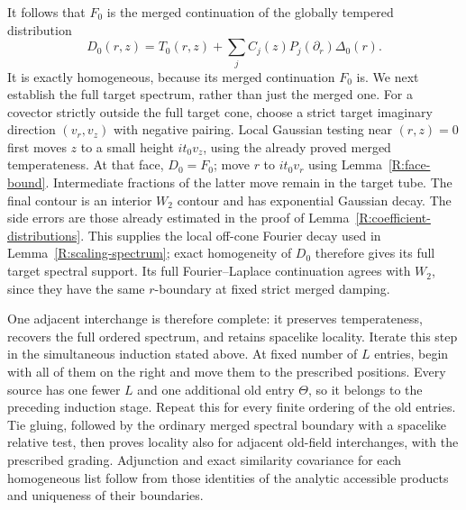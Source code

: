 It follows that $F_0$ is the merged continuation of the globally
tempered distribution
\begin{equation}\label{R:D0}
 D_0(r,z)=T_0(r,z)+\sum_j C_j(z)P_j(\partial_r)\Delta_0(r).
\end{equation}
It is exactly homogeneous, because its merged continuation $F_0$
is.  We next establish the full target spectrum, rather than just
the merged one.  For a covector strictly outside the full target
cone, choose a strict target imaginary direction $(v_r,v_z)$ with
negative pairing.  Local Gaussian testing near $(r,z)=0$ first
moves $z$ to a small height $it_0v_z$, using the already proved
merged temperateness.  At that face, $D_0=F_0$; move $r$ to
$it_0v_r$ using Lemma~\ref{R:face-bound}.  Intermediate fractions of
the latter move remain in the target tube.  The final contour is an
interior $W_2$ contour and has exponential Gaussian decay.  The side
errors are those already estimated in the proof of
Lemma~\ref{R:coefficient-distributions}.  This supplies the local
off-cone Fourier decay used in Lemma~\ref{R:scaling-spectrum}; exact
homogeneity of $D_0$ therefore gives its full target spectral support.
Its full Fourier--Laplace continuation agrees with $W_2$, since they
have the same $r$-boundary at fixed strict merged damping.

One adjacent interchange is therefore complete: it preserves
temperateness, recovers the full ordered spectrum, and retains
spacelike locality.  Iterate this step in the simultaneous
induction stated above.  At fixed number of $L$ entries, begin with
all of them on the right and move them to the prescribed positions.
Every source has one fewer $L$ and one additional old entry $\Theta$,
so it belongs to the preceding induction stage.  Repeat this for
every finite ordering of the old entries.  Tie gluing, followed by the
ordinary merged spectral boundary with a spacelike relative test,
then proves locality also for adjacent old-field interchanges, with
the prescribed grading.  Adjunction and exact similarity covariance
for each homogeneous list follow from those identities of the analytic
accessible products and uniqueness of their boundaries.

